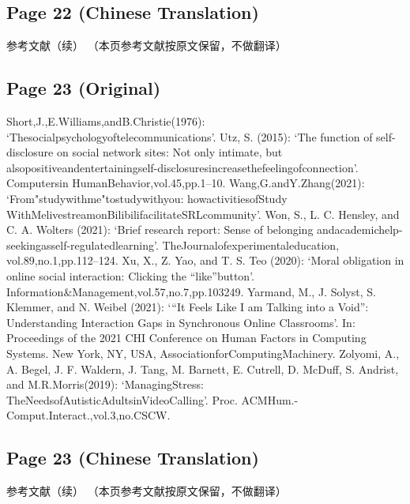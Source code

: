 \documentclass[12pt]{ctexart}
\begin{document}
\subsection*{Page 22 (Chinese Translation)}

参考文献（续）
（本页参考文献按原文保留，不做翻译）

\subsection*{Page 23 (Original)}

Short,J.,E.Williams,andB.Christie(1976): ‘Thesocialpsychologyoftelecommunications’.
Utz, S. (2015): ‘The function of self-disclosure on social network sites: Not only intimate, but
alsopositiveandentertainingself-disclosuresincreasethefeelingofconnection’. Computersin
HumanBehavior,vol.45,pp.1–10.
Wang,G.andY.Zhang(2021): ‘From"studywithme"tostudywithyou: howactivitiesofStudy
WithMelivestreamonBilibilifacilitateSRLcommunity’.
Won, S., L. C. Hensley, and C. A. Wolters (2021): ‘Brief research report: Sense of belonging
andacademichelp-seekingasself-regulatedlearning’. TheJournalofexperimentaleducation,
vol.89,no.1,pp.112–124.
Xu, X., Z. Yao, and T. S. Teo (2020): ‘Moral obligation in online social interaction: Clicking the
“like”button’. Information\&Management,vol.57,no.7,pp.103249.
Yarmand, M., J. Solyst, S. Klemmer, and N. Weibel (2021): ‘“It Feels Like I am Talking into a
Void”: Understanding Interaction Gaps in Synchronous Online Classrooms’. In: Proceedings
of the 2021 CHI Conference on Human Factors in Computing Systems. New York, NY, USA,
AssociationforComputingMachinery.
Zolyomi, A., A. Begel, J. F. Waldern, J. Tang, M. Barnett, E. Cutrell, D. McDuff, S. Andrist, and
M.R.Morris(2019): ‘ManagingStress: TheNeedsofAutisticAdultsinVideoCalling’. Proc.
ACMHum.-Comput.Interact.,vol.3,no.CSCW.

\subsection*{Page 23 (Chinese Translation)}

参考文献（续）
（本页参考文献按原文保留，不做翻译）
\end{document}
